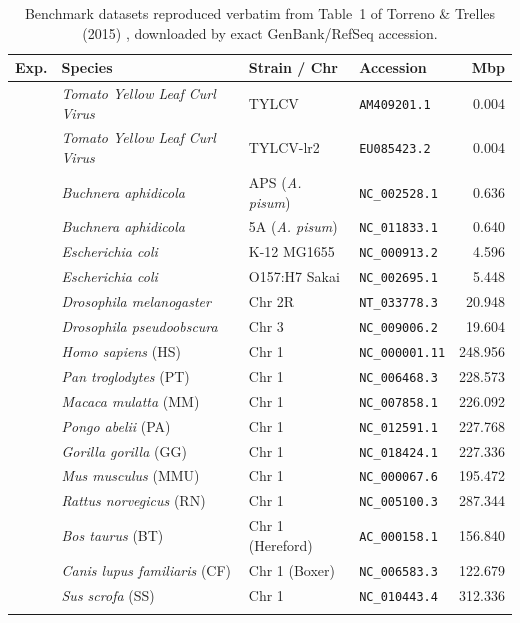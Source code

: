 \documentclass[pdflatex,sn-vancouver,Numbered]{sn-jnl}
\begin{document}
\begin{table}[ht]
\centering
\scriptsize
\setlength{\tabcolsep}{2pt}
\caption{Benchmark datasets reproduced verbatim from Table~1 of Torreno \& Trelles (2015) \cite{torreno2015gecko}, downloaded by exact GenBank/RefSeq accession.}\label{tab:datasets}
\begin{tabular*}{\textwidth}{@{\extracolsep\fill}llllr}
\toprule
Exp. & Species & Strain / Chr & Accession & Mbp \\
\midrule
{}
  & \textit{Tomato Yellow Leaf Curl Virus} & TYLCV & \texttt{AM409201.1} & 0.004 \\
  & \textit{Tomato Yellow Leaf Curl Virus} & TYLCV-lr2 & \texttt{EU085423.2} & 0.004 \\
  & \textit{Buchnera aphidicola} & APS (\textit{A. pisum}) & \texttt{NC\_002528.1} & 0.636 \\
  & \textit{Buchnera aphidicola} & 5A (\textit{A. pisum}) & \texttt{NC\_011833.1} & 0.640 \\
  & \textit{Escherichia coli} & K-12 MG1655 & \texttt{NC\_000913.2} & 4.596 \\
  & \textit{Escherichia coli} & O157:H7 Sakai & \texttt{NC\_002695.1} & 5.448 \\
  & \textit{Drosophila melanogaster} & Chr 2R & \texttt{NT\_033778.3} & 20.948 \\
  & \textit{Drosophila pseudoobscura} & Chr 3 & \texttt{NC\_009006.2} & 19.604 \\
\midrule
{}
  & \textit{Homo sapiens} (HS) & Chr 1 & \texttt{NC\_000001.11} & 248.956 \\
  & \textit{Pan troglodytes} (PT) & Chr 1 & \texttt{NC\_006468.3} & 228.573 \\
  & \textit{Macaca mulatta} (MM) & Chr 1 & \texttt{NC\_007858.1} & 226.092 \\
  & \textit{Pongo abelii} (PA) & Chr 1 & \texttt{NC\_012591.1} & 227.768 \\
  & \textit{Gorilla gorilla} (GG) & Chr 1 & \texttt{NC\_018424.1} & 227.336 \\
  & \textit{Mus musculus} (MMU) & Chr 1 & \texttt{NC\_000067.6} & 195.472 \\
  & \textit{Rattus norvegicus} (RN) & Chr 1 & \texttt{NC\_005100.3} & 287.344 \\
  & \textit{Bos taurus} (BT) & Chr 1 (Hereford) & \texttt{AC\_000158.1} & 156.840 \\
  & \textit{Canis lupus familiaris} (CF) & Chr 1 (Boxer) & \texttt{NC\_006583.3} & 122.679 \\
  & \textit{Sus scrofa} (SS) & Chr 1 & \texttt{NC\_010443.4} & 312.336 \\
\botrule
\end{tabular*}
\end{table}
\end{document}
